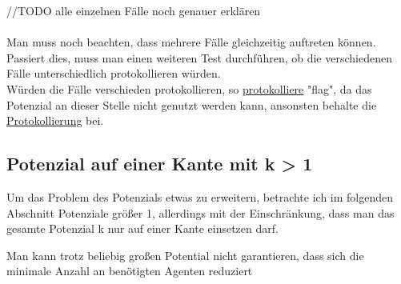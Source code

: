 //TODO alle einzelnen Fälle noch genauer erklären
\\
\\

Man muss noch beachten, dass mehrere Fälle gleichzeitig auftreten können. Passiert dies, muss man einen weiteren Test durchführen, ob die verschiedenen Fälle unterschiedlich protokollieren würden.
\\
Würden die Fälle verschieden protokollieren, so \uline{protokolliere} "flag", da das Potenzial an dieser Stelle nicht genutzt werden kann, ansonsten behalte die \uline{Protokollierung} bei.

\subsection{Potenzial auf einer Kante mit k > 1}

Um das Problem des Potenzials etwas zu erweitern, betrachte ich im folgenden Abschnitt Potenziale größer 1, allerdings mit der Einschränkung, dass man das gesamte Potenzial k nur auf einer Kante einsetzen darf.

\begin{theorem}
	Man kann trotz beliebig großen Potential nicht garantieren, dass sich die minimale Anzahl an benötigten Agenten reduziert
\end{theorem}


